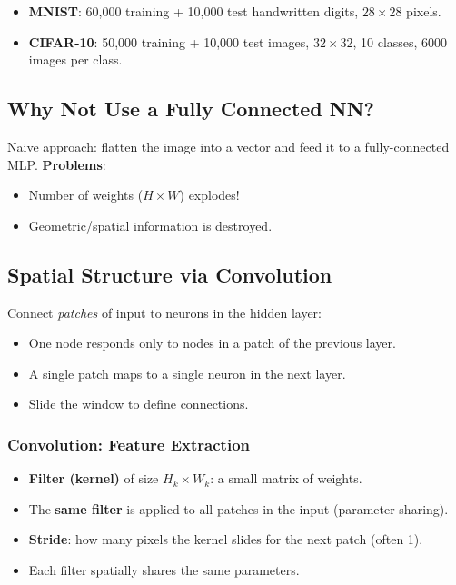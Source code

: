 \documentclass[11pt,a4paper]{article}
\begin{document}
\begin{itemize}[leftmargin=*]
    \item \textbf{MNIST}: 60,000 training + 10,000 test handwritten digits, $28\times28$ pixels.
    \item \textbf{CIFAR-10}: 50,000 training + 10,000 test images, $32\times32$, 10 classes, 6000 images per class.
\end{itemize}

\subsection{Why Not Use a Fully Connected NN?}

\begin{warningbox}
Naive approach: flatten the image into a vector and feed it to a fully-connected MLP. \textbf{Problems}:
\begin{itemize}[leftmargin=*]
    \item Number of weights ($H \times W$) explodes!
    \item Geometric/spatial information is destroyed.
\end{itemize}
\end{warningbox}

\subsection{Spatial Structure via Convolution}

\begin{keybox}[title=Winning Strategy]
Connect \emph{patches} of input to neurons in the hidden layer:
\begin{itemize}[leftmargin=*]
    \item One node responds only to nodes in a patch of the previous layer.
    \item A single patch maps to a single neuron in the next layer.
    \item Slide the window to define connections.
\end{itemize}
\end{keybox}

\subsubsection{Convolution: Feature Extraction}

\begin{definitionbox}[title=Convolution]
\begin{itemize}[leftmargin=*]
    \item \textbf{Filter (kernel)} of size $H_k \times W_k$: a small matrix of weights.
    \item The \textbf{same filter} is applied to all patches in the input (parameter sharing).
    \item \textbf{Stride}: how many pixels the kernel slides for the next patch (often 1).
    \item Each filter spatially shares the same parameters.
\end{itemize}
\end{definitionbox}
\end{document}
